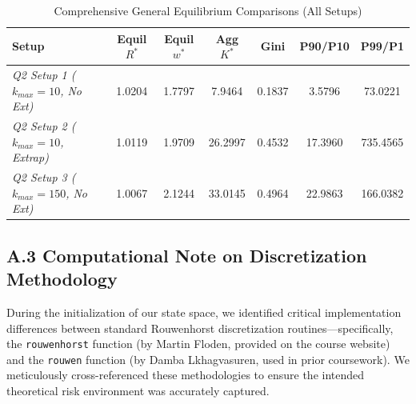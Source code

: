 \documentclass[11pt, a4paper]{article}
\begin{document}
\begin{table}[H]
\centering
\caption{Comprehensive General Equilibrium Comparisons (All Setups)}
\label{tab:GE_results_Robust}
\begin{tabular}{@{}lcccccc@{}}
\toprule
\textbf{Setup} & \textbf{Equil $R^*$} & \textbf{Equil $w^*$} & \textbf{Agg $K^*$} & \textbf{Gini} & \textbf{P90/P10} & \textbf{P99/P1} \\ \midrule
\textit{Q2 Setup 1 ($k_{max}=10$, No Ext)} & 1.0204 & 1.7797 & 7.9464 & 0.1837 & 3.5796 & 73.0221 \\
\textit{Q2 Setup 2 ($k_{max}=10$, Extrap)} & 1.0119 & 1.9709 & 26.2997 & 0.4532 & 17.3960 & 735.4565 \\
\textit{Q2 Setup 3 ($k_{max}=150$, No Ext)}   & 1.0067 & 2.1244 & 33.0145 & 0.4964 & 22.9863 & 166.0382 \\ \bottomrule
\end{tabular}
\end{table}

\subsection*{A.3 Computational Note on Discretization Methodology}

During the initialization of our state space, we identified critical implementation differences between standard Rouwenhorst discretization routines---specifically, the \texttt{rouwenhorst} function (by Martin Floden, provided on the course website) and the \texttt{rouwen} function (by Damba Lkhagvasuren, used in prior coursework). We meticulously cross-referenced these methodologies to ensure the intended theoretical risk environment was accurately captured.
\end{document}
